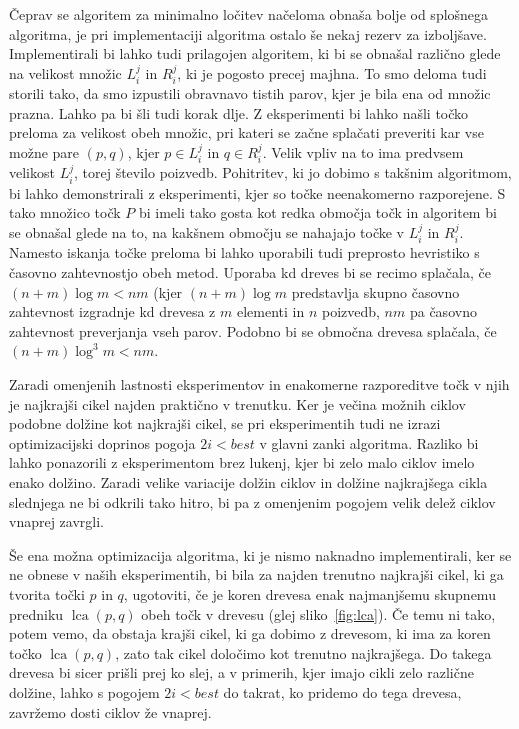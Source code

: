\documentclass[a4paper, 12pt]{book}
\begin{document}
Čeprav se algoritem za minimalno ločitev načeloma obnaša bolje od splo\-šne\-ga algoritma, je pri implementaciji algoritma ostalo še nekaj rezerv za izboljšave. Implementirali bi lahko tudi prilagojen algoritem, ki bi se obnašal različno glede na velikost množic $L_i^j$ in $R_i^j$, ki je pogosto precej majhna. To smo deloma tudi storili tako, da smo izpustili obravnavo  tistih parov, kjer je bila ena od množic prazna. Lahko pa bi šli tudi korak dlje. Z eksperimenti bi lahko našli točko preloma za velikost obeh množic, pri kateri se začne splačati preveriti kar vse možne pare $(p,q)$, kjer $p\in L_i^j$ in $q\in R_i^j$. Velik vpliv na to ima predvsem velikost $L_i^j$, torej število poizvedb. Pohitritev, ki jo dobimo s takšnim algoritmom, bi lahko demonstrirali z eksperimenti, kjer so točke neenakomerno razporejene. S tako množico točk $P$ bi imeli tako gosta kot redka območja točk in algoritem bi se obnašal glede na to, na kakšnem območju se nahajajo točke v $L_i^j$ in $R_i^j$. Namesto iskanja točke preloma bi lahko uporabili tudi preprosto hevristiko s časovno zahtevnostjo obeh metod. Uporaba kd dreves bi se recimo splačala, če $(n+m)\log m < nm$ (kjer $(n+m)\log m$ predstavlja skupno časovno zahtevnost izgradnje kd drevesa z $m$ elementi in $n$ poizvedb, $nm$ pa časovno zahtevnost preverjanja vseh parov. Podobno bi se območna drevesa splačala, če $(n+m)\log^3 m < nm$.

Zaradi omenjenih lastnosti eksperimentov in enakomerne razporeditve točk v njih je najkrajši cikel najden praktično v trenutku. Ker je večina možnih ciklov podobne dolžine kot najkrajši cikel, se pri eksperimentih tudi ne izrazi optimizacijski doprinos pogoja $2i < best$ v glavni zanki algoritma. Razliko bi lahko ponazorili z eksperimentom brez lukenj, kjer bi zelo malo ciklov imelo enako dolžino. Zaradi velike variacije dolžin ciklov in dolžine najkrajšega cikla slednjega ne bi odkrili tako hitro, bi pa z omenjenim pogojem velik delež ciklov vnaprej zavrgli.

Še ena možna optimizacija algoritma, ki je nismo naknadno implementirali, ker se ne obnese v naših eksperimentih, bi bila za najden trenutno najkrajši cikel, ki ga tvorita točki $p$ in $q$, ugotoviti, če je koren drevesa enak najmanjšemu skupnemu predniku $\operatorname{lca}(p,q)$ obeh točk v drevesu (glej sliko~\ref{fig:lca}). Če temu ni tako, potem vemo, da obstaja krajši cikel, ki ga dobimo z drevesom, ki ima za koren točko $\operatorname{lca}(p,q)$, zato tak cikel določimo kot trenutno najkrajšega. Do takega drevesa bi sicer prišli prej ko slej, a v primerih, kjer imajo cikli zelo različne dolžine, lahko s pogojem $2i < best$ do takrat, ko pridemo do tega drevesa, zavržemo dosti ciklov že vnaprej.
\end{document}
